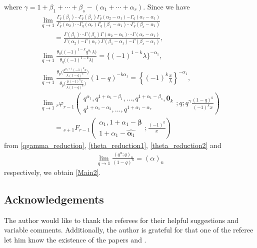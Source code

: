 \documentclass[pdftex]{sigma}
\numberwithin{equation}{section}
\begin{document}
where $\gamma=1+\beta_1+\cdots+\beta_s-(\alpha_1+\cdots+\alpha_r)$. Since we have
\begin{gather*}
\lim_{q\to1}\frac{\Gamma_q(\beta_1)\cdots\Gamma_q(\beta_s)\Gamma_q(\alpha_2-\alpha_1)\cdots\Gamma_q(\alpha_r-\alpha_1)}{\Gamma_q(\alpha_2)\cdots\Gamma_q(\alpha_r)\Gamma_q(\beta_1-\alpha_1)\cdots\Gamma_q(\beta_s-\alpha_1)}\\
\qquad{} =\frac{\Gamma(\beta_1)\cdots\Gamma(\beta_s)\Gamma(\alpha_2-\alpha_1)\cdots\Gamma(\alpha_r-\alpha_1)}{\Gamma(\alpha_2)\cdots\Gamma(\alpha_r)\Gamma(\beta_1-\alpha_1)\cdots\Gamma(\beta_s-\alpha_1)},\\
\lim_{q\to1}\frac{\theta_q\big((-1)^{1-k}q^{\alpha_1}\lambda\big)}{\theta_q\big((-1)^{1-k}\lambda\big)}=\big\{(-1)^{1-k}\lambda\big\}^{-\alpha_1},\\
\lim_{q\to1}\frac{\theta_{p}\big(\frac{p^{\alpha_1+1}(-1)^kx}{\lambda(1-q)^k}\big)}{\theta_{p}\big(\frac{p(-1)^kx}{\lambda(1-q)^k}\big)}(1-q)^{-k\alpha_1}=\left\{(-1)^k\frac{x}{\lambda}\right\}^{-\alpha_1},\\
\lim_{q\to1}{}_r\varphi_{r-1}\left(\begin{matrix}q^{\alpha_1},q^{1+\alpha_1-\beta_1},\ldots,q^{1+\alpha_1-\beta_s},\bm{0}_k\\q^{1+\alpha_1-\alpha_2},\ldots,q^{1+\alpha_1-\alpha_r}
\end{matrix} ;q;q^{\gamma}\frac{(1-q)^k}{(-1)^kx}\right)\\
\qquad{} ={}_{s+1}F_{r-1}\left(\begin{matrix}\alpha_1,1+\alpha_1-\bm{\beta}\\1+\alpha_1-\widehat{\bm{\alpha}_1}
\end{matrix} ;\frac{(-1)^k}{x}\right)
\end{gather*}
from \eqref{qgamma_reduction}, \eqref{theta_reduction1}, \eqref{theta_reduction2} and
\begin{gather*}
\lim_{q\to1}\frac{(q^\alpha;q)_n}{(1-q)^n}=(\alpha)_n
\end{gather*}
respectively, we obtain \eqref{Main2}.

\subsection*{Acknowledgements}

The author would like to thank the referees for their helpful suggestions and variable comments. Additionally, the author is grateful for that one of the referee let him know the existence of the papers \cite{Dreyfus2015_2} and \cite{Sauloy2000}.
\end{document}
